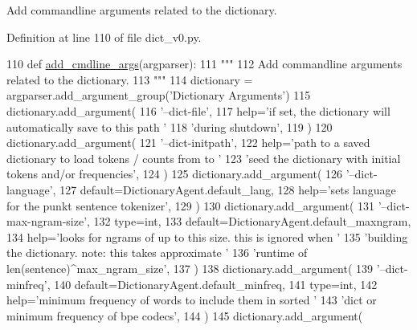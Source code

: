 \begin{DoxyVerb}Add commandline arguments related to the dictionary.
\end{DoxyVerb}
 

Definition at line 110 of file dict\+\_\+v0.\+py.


\begin{DoxyCode}
110     \textcolor{keyword}{def }\hyperlink{namespaceparlai_1_1agents_1_1drqa_1_1config_a62fdd5554f1da6be0cba185271058320}{add\_cmdline\_args}(argparser):
111         \textcolor{stringliteral}{"""}
112 \textcolor{stringliteral}{        Add commandline arguments related to the dictionary.}
113 \textcolor{stringliteral}{        """}
114         dictionary = argparser.add\_argument\_group(\textcolor{stringliteral}{'Dictionary Arguments'})
115         dictionary.add\_argument(
116             \textcolor{stringliteral}{'--dict-file'},
117             help=\textcolor{stringliteral}{'if set, the dictionary will automatically save to this path '}
118             \textcolor{stringliteral}{'during shutdown'},
119         )
120         dictionary.add\_argument(
121             \textcolor{stringliteral}{'--dict-initpath'},
122             help=\textcolor{stringliteral}{'path to a saved dictionary to load tokens / counts from to '}
123             \textcolor{stringliteral}{'seed the dictionary with initial tokens and/or frequencies'},
124         )
125         dictionary.add\_argument(
126             \textcolor{stringliteral}{'--dict-language'},
127             default=DictionaryAgent.default\_lang,
128             help=\textcolor{stringliteral}{'sets language for the punkt sentence tokenizer'},
129         )
130         dictionary.add\_argument(
131             \textcolor{stringliteral}{'--dict-max-ngram-size'},
132             type=int,
133             default=DictionaryAgent.default\_maxngram,
134             help=\textcolor{stringliteral}{'looks for ngrams of up to this size. this is ignored when '}
135             \textcolor{stringliteral}{'building the dictionary. note: this takes approximate '}
136             \textcolor{stringliteral}{'runtime of len(sentence)^max\_ngram\_size'},
137         )
138         dictionary.add\_argument(
139             \textcolor{stringliteral}{'--dict-minfreq'},
140             default=DictionaryAgent.default\_minfreq,
141             type=int,
142             help=\textcolor{stringliteral}{'minimum frequency of words to include them in sorted '}
143             \textcolor{stringliteral}{'dict or minimum frequency of bpe codecs'},
144         )
145         dictionary.add\_argument(

\end{DoxyCode}

